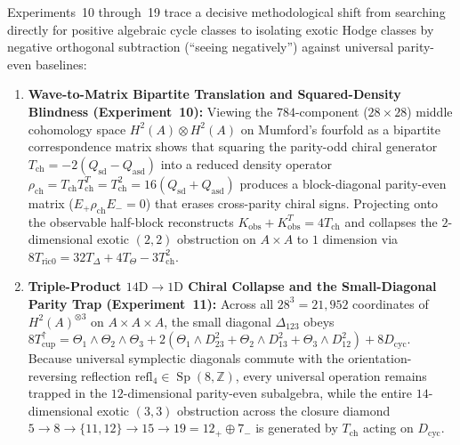 \documentclass[11pt,a4paper]{article}
\begin{document}
Experiments~10 through~19 trace a decisive methodological shift from searching directly for positive algebraic cycle classes to isolating exotic Hodge classes by negative orthogonal subtraction (``seeing negatively'') against universal parity-even baselines:
\begin{enumerate}
  \item \textbf{Wave-to-Matrix Bipartite Translation and Squared-Density Blindness (Experiment~10):} Viewing the $784$-component ($28\times 28$) middle cohomology space $H^2(A) \otimes H^2(A)$ on Mumford's fourfold as a bipartite correspondence matrix shows that squaring the parity-odd chiral generator $T_{\mathrm{ch}} = -2(Q_{\mathrm{sd}} - Q_{\mathrm{asd}})$ into a reduced density operator $\rho_{\mathrm{ch}} = T_{\mathrm{ch}} T_{\mathrm{ch}}^T = T_{\mathrm{ch}}^2 = 16(Q_{\mathrm{sd}} + Q_{\mathrm{asd}})$ produces a block-diagonal parity-even matrix ($E_+ \rho_{\mathrm{ch}} E_- = 0$) that erases cross-parity chiral signs. Projecting onto the observable half-block reconstructs $K_{\mathrm{obs}} + K_{\mathrm{obs}}^T = 4 T_{\mathrm{ch}}$ and collapses the $2$-dimensional exotic $(2,2)$ obstruction on $A \times A$ to $1$ dimension via $8 T_{\mathrm{ric0}} = 32 T_\Delta + 4 T_\Theta - 3 T_{\mathrm{ch}}^2$.
  \item \textbf{Triple-Product $14\mathrm{D} \to 1\mathrm{D}$ Chiral Collapse and the Small-Diagonal Parity Trap (Experiment~11):} Across all $28^3 = 21{,}952$ coordinates of $H^2(A)^{\otimes 3}$ on $A \times A \times A$, the small diagonal $\Delta_{123}$ obeys $8 T_{\mathrm{cup}}^\uparrow = \Theta_1\wedge\Theta_2\wedge\Theta_3 + 2(\Theta_1\wedge D_{23}^2 + \Theta_2\wedge D_{13}^2 + \Theta_3\wedge D_{12}^2) + 8 D_{\mathrm{cyc}}$. Because universal symplectic diagonals commute with the orientation-reversing reflection $\mathrm{refl}_4 \in \operatorname{Sp}(8, \mathbb{Z})$, every universal operation remains trapped in the $12$-dimensional parity-even subalgebra, while the entire $14$-dimensional exotic $(3,3)$ obstruction across the closure diamond $5 \to 8 \to \{11, 12\} \to 15 \to 19 = 12_+ \oplus 7_-$ is generated by $T_{\mathrm{ch}}$ acting on $D_{\mathrm{cyc}}$.

\end{enumerate}
\end{document}
